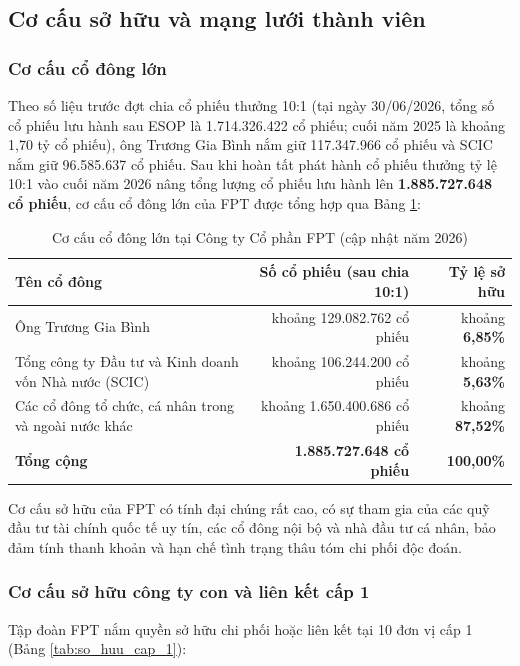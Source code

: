\subsection{Cơ cấu sở hữu và mạng lưới thành viên}

\subsubsection{Cơ cấu cổ đông lớn}
Theo số liệu trước đợt chia cổ phiếu thưởng 10:1 (tại ngày 30/06/2026, tổng số cổ phiếu lưu hành sau ESOP là 1.714.326.422 cổ phiếu; cuối năm 2025 là khoảng 1,70 tỷ cổ phiếu), ông Trương Gia Bình nắm giữ 117.347.966 cổ phiếu và SCIC nắm giữ 96.585.637 cổ phiếu. Sau khi hoàn tất phát hành cổ phiếu thưởng tỷ lệ 10:1 vào cuối năm 2026 nâng tổng lượng cổ phiếu lưu hành lên \textbf{1.885.727.648 cổ phiếu}, cơ cấu cổ đông lớn của FPT được tổng hợp qua Bảng \ref{tab:co_dong_lon}:

\begin{table}[htbp]
\centering
\caption{Cơ cấu cổ đông lớn tại Công ty Cổ phần FPT (cập nhật năm 2026)}
\label{tab:co_dong_lon}
\begin{tabularx}{\textwidth}{Xrr}
\toprule
\textbf{Tên cổ đông} & \textbf{Số cổ phiếu (sau chia 10:1)} & \textbf{Tỷ lệ sở hữu} \\
\midrule
Ông Trương Gia Bình & khoảng 129.082.762 cổ phiếu & khoảng \textbf{6,85\%} \\
Tổng công ty Đầu tư và Kinh doanh vốn Nhà nước (SCIC) & khoảng 106.244.200 cổ phiếu & khoảng \textbf{5,63\%} \\
Các cổ đông tổ chức, cá nhân trong và ngoài nước khác & khoảng 1.650.400.686 cổ phiếu & khoảng \textbf{87,52\%} \\
\midrule
\textbf{Tổng cộng} & \textbf{1.885.727.648 cổ phiếu} & \textbf{100,00\%} \\
\bottomrule
\end{tabularx}
\end{table}

Cơ cấu sở hữu của FPT có tính đại chúng rất cao, có sự tham gia của các quỹ đầu tư tài chính quốc tế uy tín, các cổ đông nội bộ và nhà đầu tư cá nhân, bảo đảm tính thanh khoản và hạn chế tình trạng thâu tóm chi phối độc đoán.

\subsubsection{Cơ cấu sở hữu công ty con và liên kết cấp 1}
Tập đoàn FPT nắm quyền sở hữu chi phối hoặc liên kết tại 10 đơn vị cấp 1 (Bảng \ref{tab:so_huu_cap_1}):

